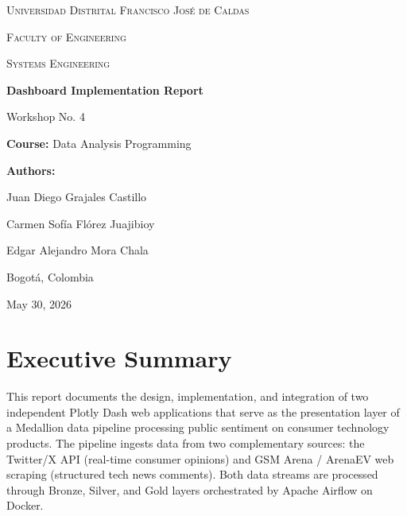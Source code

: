 \documentclass[12pt, a4paper]{article}
\begin{document}
\begin{titlepage}
    \centering
    \vspace*{2cm}
    
    {\Large \textsc{Universidad Distrital Francisco José de Caldas}\par}
    \vspace{0.5cm}
    {\large \textsc{Faculty of Engineering}\par}
    {\large \textsc{Systems Engineering}\par}
    
    \vspace{3cm}
    
    {\Huge \bfseries Dashboard Implementation Report \par}
    \vspace{0.5cm}
    {\Large Workshop No. 4\par}
    
    \vspace{1.5cm}
    
    {\large \textbf{Course:} Data Analysis Programming\par}
    
    \vspace{3cm}
    
    {\Large \textbf{Authors:}\par}
    \vspace{0.5cm}
    {\large Juan Diego Grajales Castillo\par}
    {\large Carmen Sofía Flórez Juajibioy\par}
    {\large Edgar Alejandro Mora Chala\par}
    
    \vfill
    
    {\large Bogotá, Colombia \par}
    {\large May 30, 2026\par}
\end{titlepage}

\tableofcontents
\newpage


\section{Executive Summary}
This report documents the design, implementation, and integration of two independent Plotly Dash web applications that serve as the presentation layer of a Medallion data pipeline processing public sentiment on consumer technology products. The pipeline ingests data from two complementary sources: the Twitter/X API (real-time consumer opinions) and GSM Arena / ArenaEV web scraping (structured tech news comments). Both data streams are processed through Bronze, Silver, and Gold layers orchestrated by Apache Airflow on Docker.
\end{document}
